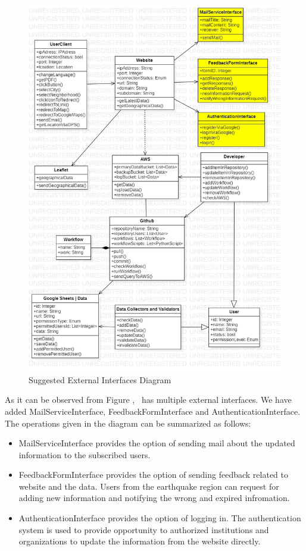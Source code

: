 \begin{figure}[H]
  \centering
  \includegraphics[width=\linewidth]{img/external-interfaces-diagram-s5.jpg}
  \caption{Suggested External Interfaces Diagram}
\end{figure}

As it can be observed from Figure , \afetbilgi\ has multiple external interfaces. We have added MailServiceInterface, FeedbackFormInterface and AuthenticationInterface. The operations given in the diagram can be summarized as follows:
\begin{itemize}
  \item MailServiceInterface provides the option of sending mail about the updated information to the subscribed users.
  \item FeedbackFormInterface provides the option of sending feedback related to website and the data. Users from the earthquake region can request for adding new information and notifying the wrong and expired infromation.
  \item AuthenticationInterface provides the option of logging in. The authentication system is used to provide opportunity to authorized institutions and organizations to update the information from the website directly.
\end{itemize}

